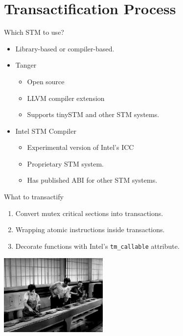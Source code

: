 \documentclass[]{beamer}
\newcommand{\Tanger}{{\sc Tanger}~}
\begin{document}
\section{Transactification Process}

\begin{frame}{Which STM to use?}
    \begin{itemize}
        \item Library-based or \alert<2->{compiler-based}.
        \item<3-> {\Tanger}
            \begin{itemize}
                \item Open source
                \item LLVM compiler extension
                \item Supports tinySTM and other STM systems.
            \end{itemize}
        \item<3-> \alert<4->{Intel STM Compiler}
            \begin{itemize}
                \item Experimental version of Intel's ICC
                \item Proprietary STM system.
                \item Has published ABI for other STM systems.
            \end{itemize}
    \end{itemize}
\end{frame}

\begin{frame}{What to transactify}
\begin{enumerate}
\item Convert mutex critical sections into transactions.
\item Wrapping atomic instructions inside transactions.
\item Decorate functions with Intel's {\tt tm\_callable} attribute.
\end{enumerate}
\begin{center}\includegraphics[height=4cm]{modern-times-assembly-line.jpg}\end{center}
\end{frame}
\end{document}
